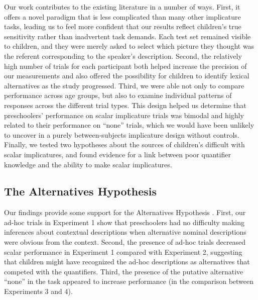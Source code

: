 \documentclass[man]{apa2}
\begin{document}

Our work contributes to the existing literature in a number of ways. First, it offers a novel paradigm that is less complicated than many other implicature tasks, leading us to feel more confident that our results reflect children's true sensitivity rather than inadvertent task demands. Each test set remained visible to children, and they were merely asked to select which picture they thought was the referent corresponding to the speaker's description. Second, the relatively high number of trials for each participant both helped increase the precision of our measurements and also offered the possibility for children to identify lexical alternatives as the study progressed. Third, we were able not only to compare performance across age groups, but also to examine individual patterns of responses across the different trial types. This design helped us determine that preschoolers' performance on scalar implicature trials was bimodal and highly related to their performance on ``none'' trials, which we would have been unlikely to uncover in a purely between-subjects implicature design without controls. Finally, we tested two hypotheses about the sources of children's difficult with scalar implicatures, and found evidence for a link between poor quantifier knowledge and the ability to make scalar implicatures.

\subsection{The Alternatives Hypothesis}

Our findings provide some support for the Alternatives Hypothesis \cite{barner2010,barner2011}. First, our ad-hoc trials in Experiment 1 show that preschoolers had no difficulty making inferences about contextual descriptions when alternative nominal descriptions were obvious from the context. Second, the presence of ad-hoc trials decreased scalar performance in Experiment 1 compared with Experiment 2, suggesting that children might have recognized the ad-hoc descriptions as alternatives that competed with the quantifiers. Third, the presence of the putative alternative ``none'' in the task appeared to increase performance (in the comparison between Experiments 3 and 4).

\end{document}
